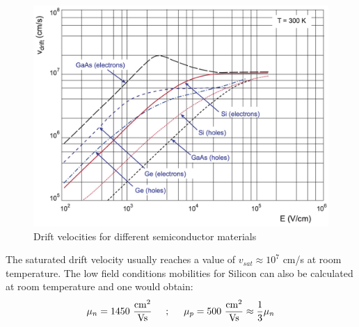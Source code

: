 		\begin{figure}[h]
			\centering
			\includegraphics[width=0.6\linewidth]{files/electron-hole_driftvelocity}
			\caption{ Drift velocities for different semiconductor materials}
			\label{ }
		\end{figure}
		
		
		
	

		The saturated drift velocity usually reaches a value of $v_{sat} \approx 10^7$ cm/s at room temperature. The low field conditions mobilities for Silicon can also be calculated at room temperature and one would obtain: 
		\begin{equation}
			\mu_n = 1450\ \frac{\text{cm}^2}{\text{Vs}} \hspace{5mm} ; \hspace{5mm} \mu_p = 500\ \frac{\text{cm}^2}{\text{Vs}} \approx \frac{1}{3} \mu_n
		\end{equation} 

